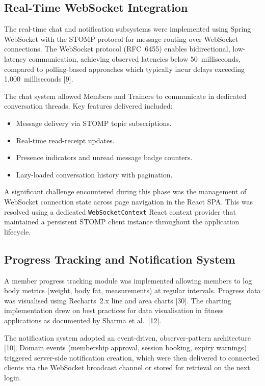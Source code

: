\documentclass[
  12pt,
  a4paperpaper,
]{report}
\providecommand{\tightlist}{%
  \setlength{\itemsep}{0pt}\setlength{\parskip}{0pt}\setlength{\topsep}{2pt}\setlength{\partopsep}{0pt}}
\begin{document}
\subsection{Real-Time WebSocket
Integration}\label{realtime-websocket}

The real-time chat and notification subsystems were implemented using
Spring WebSocket with the STOMP protocol for message routing over
WebSocket connections. The WebSocket protocol (RFC~6455) enables
bidirectional, low-latency communication, achieving observed
latencies below 50~milliseconds, compared to polling-based
approaches which typically incur delays exceeding 1,000~milliseconds
{[}9{]}.

The chat system allowed Members and Trainers to communicate in de\-di\-ca\-ted
conversation threads. Key features delivered included:

\begin{itemize}
\tightlist
\item Message delivery via STOMP topic subscriptions.
\item Real-time read-receipt updates.
\item Presence indicators and unread message badge counters.
\item Lazy-loaded conversation history with pagination.
\end{itemize}

A significant challenge encountered during this phase was the
management of WebSocket connection state across page navigation in
the React SPA. This was resolved using a dedicated
\texttt{WebSocketContext} React context provider that maintained a
persistent STOMP client instance throughout the application
lifecycle.

\subsection{Progress Tracking and Notification
System}\label{progress-and-notifications}

A member progress tracking module was implemented allowing members to
log body metrics (weight, body fat, measurements) at regular
intervals. Progress data was visualised using Recharts~2.x line and
area charts {[}30{]}. The charting implementation drew on
best practices for data visualisation in fitness applications as
documented by Sharma et al.~{[}12{]}.

The notification system adopted an event-driven, observer-pattern
architecture {[}10{]}. Domain events (membership approval,
session booking, expiry warnings) triggered server-side notification
creation, which were then delivered to connected clients via the
WebSocket broadcast channel or stored for retrieval on the next
login.
\end{document}
